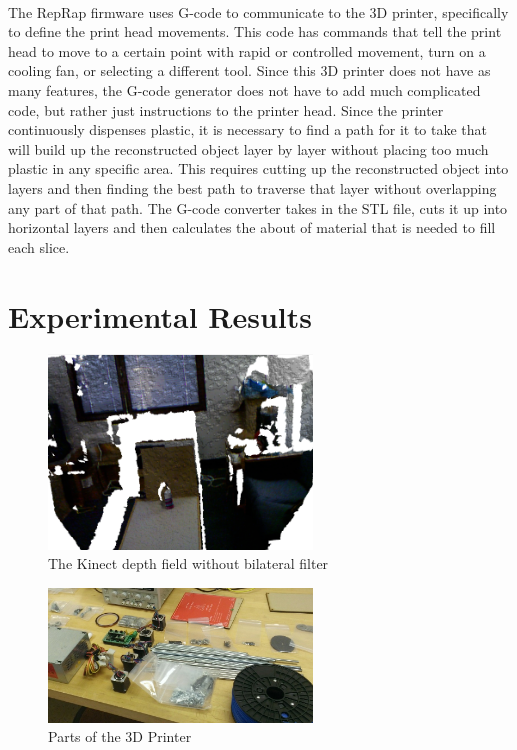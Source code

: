 \documentclass[12pt,twocolumn]{article}
\begin{document}

\\ 
The RepRap firmware uses G-code to communicate to the 3D printer, specifically to define the print head movements. This code has commands that tell the print head to move to a certain point with rapid or controlled movement, turn on a cooling fan, or selecting a different tool. Since this 3D printer does not have as many features, the G-code generator does not have to add much complicated code, but rather just instructions to the printer head. Since the printer continuously dispenses plastic, it is necessary to find a path for it to take that will build up the reconstructed object layer by layer without placing too much plastic in any specific area. This requires cutting up the reconstructed object into layers and then finding the best path to traverse that layer without overlapping any part of that path. The G-code converter takes in the STL file, cuts it up into horizontal layers and then calculates the about of material that is needed to fill each slice. 



\section{Experimental Results}

\begin{figure}[ht!]
\centering
\includegraphics[width=70mm]{kinectwaterbottle.png}
\caption{The Kinect depth field without bilateral filter}
\label{overflow}
\end{figure}

\begin{figure}[ht!]
\centering
\includegraphics[width=70mm]{WP_20130223_002.jpg}
\caption{Parts of the 3D Printer}
\label{overflow}
\end{figure}
\end{document}
